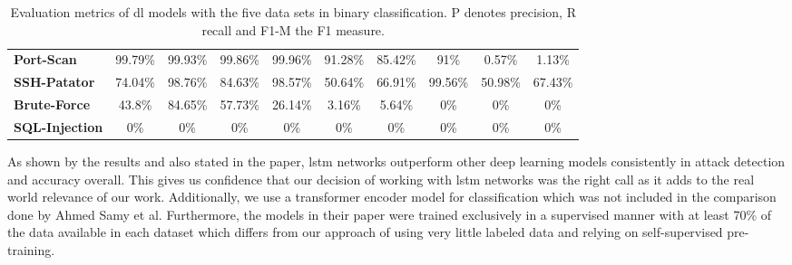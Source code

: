 \begin{table}[h]
{\begin{tabular}{l|c|c|c|c|c|c|c|c|c}
		\textbf{Port-Scan} & 99.79\%  & 99.93\%  & 99.86\%     & 99.96\%  & 91.28\%  & 85.42\%     & 91\%      & 0.57\%   & 1.13\%      \\
		\textbf{SSH-Patator} & 74.04\%  & 98.76\%  & 84.63\%     & 98.57\%  & 50.64\%  & 66.91\%     & 99.56\%   & 50.98\%  & 67.43\%     \\
		\textbf{Brute-Force} & 43.8\%   & 84.65\%  & 57.73\%     & 26.14\%  & 3.16\%   & 5.64\%      & 0\%       & 0\%      & 0\%         \\
		\textbf{SQL-Injection} & 0\%      & 0\%      & 0\%         & 0\%      & 0\%      & 0\%         & 0\%       & 0\%      & 0\%        
	\end{tabular}}
	\caption{Evaluation metrics of \gls{dl} models with the five data sets in binary classification. P denotes precision, R recall and F1-M the F1 measure. \cite{fog_based_detection_survey_2020}}
	\label{table:stateofart:fog_based_detection_survey_2020_results_class}
\end{table}

As shown by the results and also stated in the paper, \gls{lstm} networks outperform other deep learning models consistently in attack detection and accuracy overall. This gives us confidence that our decision of working with \gls{lstm} networks was the right call as it adds to the real world relevance of our work. Additionally, we use a transformer encoder model for classification which was not included in the comparison done by Ahmed Samy et al. Furthermore, the models in their paper were trained exclusively in a supervised manner with at least 70\% of the data available in each dataset which differs from our approach of using very little labeled data and relying on self-supervised pre-training. \par

